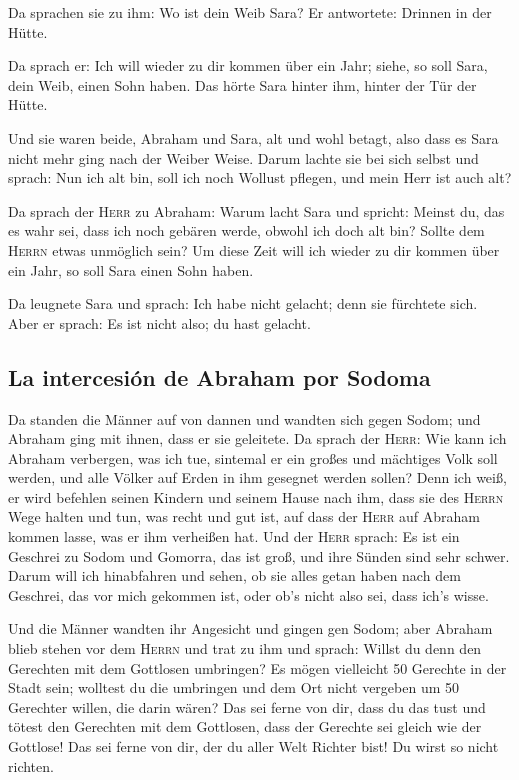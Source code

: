  Da sprachen sie zu ihm: Wo ist dein Weib Sara? Er
antwortete: Drinnen in der Hütte.

 Da sprach er: Ich will wieder zu dir kommen über ein
Jahr; siehe, so soll Sara, dein Weib, einen Sohn haben. Das hörte Sara
hinter ihm, hinter der Tür der Hütte.

 Und sie waren beide, Abraham und Sara, alt und wohl
betagt, also dass es Sara nicht mehr ging nach der Weiber Weise.
 Darum lachte sie bei sich selbst und sprach: Nun ich alt
bin, soll ich noch Wollust pflegen, und mein Herr ist auch alt?

 Da sprach der \textsc{Herr} zu Abraham: Warum lacht Sara
und spricht: Meinst du, das es wahr sei, dass ich noch gebären werde,
obwohl ich doch alt bin?  Sollte dem \textsc{Herrn} etwas
unmöglich sein? Um diese Zeit will ich wieder zu dir kommen über ein
Jahr, so soll Sara einen Sohn haben.

 Da leugnete Sara und sprach: Ich habe nicht gelacht;
denn sie fürchtete sich. Aber er sprach: Es ist nicht also; du hast
gelacht.

\hypertarget{la-intercesiuxf3n-de-abraham-por-sodoma}{%
\subsection{La intercesión de Abraham por
Sodoma}\label{la-intercesiuxf3n-de-abraham-por-sodoma}}

 Da standen die Männer auf von dannen und wandten sich
gegen Sodom; und Abraham ging mit ihnen, dass er sie geleitete.
 Da sprach der \textsc{Herr}: Wie kann ich Abraham
verbergen, was ich tue,  sintemal er ein großes und
mächtiges Volk soll werden, und alle Völker auf Erden in ihm gesegnet
werden sollen?  Denn ich weiß, er wird befehlen seinen
Kindern und seinem Hause nach ihm, dass sie des \textsc{Herrn} Wege
halten und tun, was recht und gut ist, auf dass der \textsc{Herr} auf
Abraham kommen lasse, was er ihm verheißen hat.  Und der
\textsc{Herr} sprach: Es ist ein Geschrei zu Sodom und Gomorra, das ist
groß, und ihre Sünden sind sehr schwer.  Darum will ich
hinabfahren und sehen, ob sie alles getan haben nach dem Geschrei, das
vor mich gekommen ist, oder ob's nicht also sei, dass ich's wisse.

 Und die Männer wandten ihr Angesicht und gingen gen
Sodom; aber Abraham blieb stehen vor dem \textsc{Herrn} 
und trat zu ihm und sprach: Willst du denn den Gerechten mit dem
Gottlosen umbringen?  Es mögen vielleicht 50 Gerechte in
der Stadt sein; wolltest du die umbringen und dem Ort nicht vergeben um
50 Gerechter willen, die darin wären?  Das sei ferne von
dir, dass du das tust und tötest den Gerechten mit dem Gottlosen, dass
der Gerechte sei gleich wie der Gottlose! Das sei ferne von dir, der du
aller Welt Richter bist! Du wirst so nicht richten.

